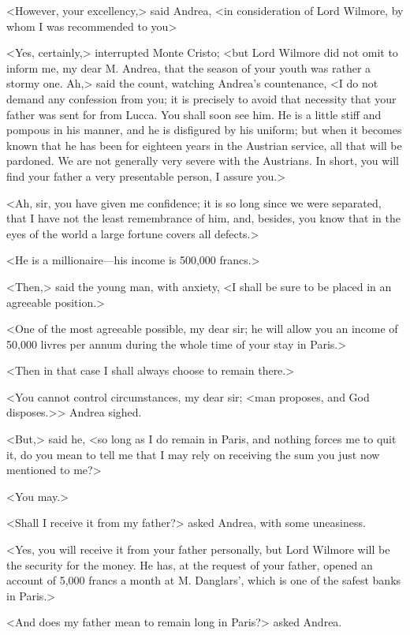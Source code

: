  <However, your excellency,> said Andrea, <in consideration of Lord Wilmore, by whom I was recommended to you\longdash> 

 <Yes, certainly,> interrupted Monte Cristo; <but Lord Wilmore did not omit to inform me, my dear M. Andrea, that the season of your youth was rather a stormy one. Ah,> said the count, watching Andrea's countenance, <I do not demand any confession from you; it is precisely to avoid that necessity that your father was sent for from Lucca. You shall soon see him. He is a little stiff and pompous in his manner, and he is disfigured by his uniform; but when it becomes known that he has been for eighteen years in the Austrian service, all that will be pardoned. We are not generally very severe with the Austrians. In short, you will find your father a very presentable person, I assure you.> 

 <Ah, sir, you have given me confidence; it is so long since we were separated, that I have not the least remembrance of him, and, besides, you know that in the eyes of the world a large fortune covers all defects.> 

 <He is a millionaire—his income is 500,000 francs.> 

 <Then,> said the young man, with anxiety, <I shall be sure to be placed in an agreeable position.> 

 <One of the most agreeable possible, my dear sir; he will allow you an income of 50,000 livres per annum during the whole time of your stay in Paris.> 

 <Then in that case I shall always choose to remain there.> 

 <You cannot control circumstances, my dear sir; <man proposes, and God disposes.>> Andrea sighed. 

 <But,> said he, <so long as I do remain in Paris, and nothing forces me to quit it, do you mean to tell me that I may rely on receiving the sum you just now mentioned to me?> 

 <You may.> 

 <Shall I receive it from my father?> asked Andrea, with some uneasiness. 

 <Yes, you will receive it from your father personally, but Lord Wilmore will be the security for the money. He has, at the request of your father, opened an account of 5,000 francs a month at M. Danglars', which is one of the safest banks in Paris.> 

 <And does my father mean to remain long in Paris?> asked Andrea. 

